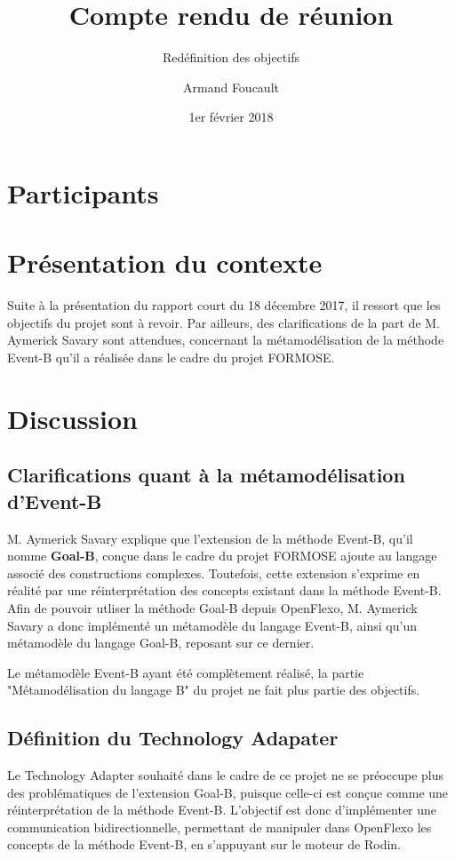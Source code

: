 \documentclass{article}
\author{Armand Foucault}
\date{1er février 2018}
\title{Compte rendu de réunion}
\subtitle{Redéfinition des objectifs}
\begin{document}
\imtammMaketitle

\section*{Participants}

\begin{imtammActorList}
\item \actorasavary
\item \actorjcbach
\item \actorafoucaul
\end{imtammActorList}


\section*{Présentation du contexte}
Suite à la présentation du rapport court du 18 décembre 2017, il ressort que les objectifs du projet sont à revoir.
Par ailleurs, des clarifications de la part de M. Aymerick Savary sont attendues, concernant la métamodélisation de la méthode Event-B qu'il a réalisée dans le cadre du projet FORMOSE.


\section*{Discussion}

\subsection*{Clarifications quant à la métamodélisation d'Event-B}
M. Aymerick Savary explique que l'extension de la méthode Event-B, qu'il nomme \textbf{Goal-B}, conçue dans le cadre du projet FORMOSE ajoute au langage associé des constructions complexes.
Toutefois, cette extension s'exprime en réalité par une réinterprétation des concepts existant dans la méthode Event-B.
Afin de pouvoir utliser la méthode Goal-B depuis OpenFlexo, M. Aymerick Savary a donc implémenté un métamodèle du langage Event-B, ainsi qu'un métamodèle du langage Goal-B, reposant sur ce dernier.

Le métamodèle Event-B ayant été complètement réalisé, la partie "Métamodélisation du langage B" du projet ne fait plus partie des objectifs.

\subsection*{Définition du Technology Adapater}
Le Technology Adapter souhaité dans le cadre de ce projet ne se préoccupe plus des problématiques de l'extension Goal-B, puisque celle-ci est conçue comme une réinterprétation de la méthode Event-B.
L'objectif est donc d'implémenter une communication bidirectionnelle, permettant de manipuler dans OpenFlexo les concepts de la méthode Event-B, en s'appuyant sur le moteur de Rodin.
\end{document}
